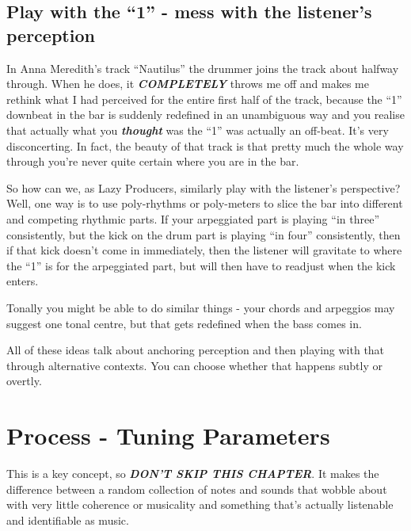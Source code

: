 \documentclass[
  12pt,
  letterpaper,
  oneside,
  open=any]{scrbook}
\begin{document}
\section{Play with the ``1'' - mess with the listener's
perception}\label{play-with-the-1---mess-with-the-listeners-perception}

In Anna Meredith's track ``Nautilus'' the drummer joins the track about
halfway through. When he does, it \textbf{\emph{COMPLETELY}} throws me
off and makes me rethink what I had perceived for the entire first half
of the track, because the ``1'' downbeat in the bar is suddenly
redefined in an unambiguous way and you realise that actually what you
\textbf{\emph{thought}} was the ``1'' was actually an off-beat. It's
very disconcerting. In fact, the beauty of that track is that pretty
much the whole way through you're never quite certain where you are in
the bar.

So how can we, as Lazy Producers, similarly play with the listener's
perspective? Well, one way is to use poly-rhythms or poly-meters to
slice the bar into different and competing rhythmic parts. If your
arpeggiated part is playing ``in three'' consistently, but the kick on
the drum part is playing ``in four'' consistently, then if that kick
doesn't come in immediately, then the listener will gravitate to where
the ``1'' is for the arpeggiated part, but will then have to readjust
when the kick enters.

Tonally you might be able to do similar things - your chords and
arpeggios may suggest one tonal centre, but that gets redefined when the
bass comes in.

All of these ideas talk about anchoring perception and then playing with
that through alternative contexts. You can choose whether that happens
subtly or overtly.


\chapter{Process - Tuning
Parameters}\label{Chapter-009-Process-Tuning_Parameters}

This is a key concept, so \textbf{\emph{DON'T SKIP THIS CHAPTER}}. It
makes the difference between a random collection of notes and sounds
that wobble about with very little coherence or musicality and something
that's actually listenable and identifiable as music.
\end{document}
